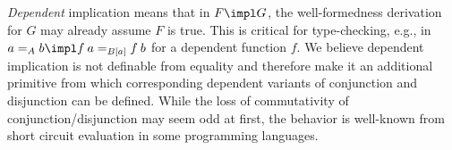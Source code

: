 

\emph{Dependent} implication means that in $F\impl G$, the well-formedness derivation for $G$ may already assume $F$ is true.
This is critical for type-checking, e.g., in \(a =_A b \impl f\: a =_{B[a]} f\: b\) for a dependent function $f$.
We believe dependent implication is not definable from equality and therefore make it an additional primitive from which corresponding dependent variants of conjunction and disjunction can be defined.
While the loss of commutativity of conjunction/disjunction may seem odd at first, the behavior is well-known from short circuit
evaluation in some programming languages.



